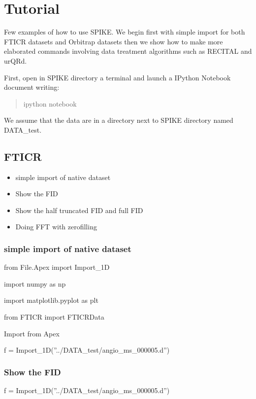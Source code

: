 \documentclass[letterpaper,10pt,openany,oneside]{sphinxmanual}
\begin{document}
\chapter{Tutorial}
\label{rst/tutorial::doc}\label{rst/tutorial:tutorial}
Few examples of how to use SPIKE.
We begin first with simple import for both FTICR datasets and Orbitrap datasets then we show how to make more elaborated commands involving data treatment algorithms such as RECITAL and urQRd.

First, open in SPIKE directory a terminal and launch a IPython Notebook document writing:
\begin{quote}

ipython notebook
\end{quote}

We assume that the data are in a directory next to SPIKE directory named DATA\_test.


\section{FTICR}
\label{rst/tutorial:fticr}\begin{itemize}
\item {} 
simple import of native dataset

\item {} 
Show the FID

\item {} 
Show the half truncated FID and full FID

\item {} 
Doing FFT with zerofilling

\end{itemize}


\subsection{simple import of native dataset}
\label{rst/tutorial:simple-import-of-native-dataset}
from File.Apex import Import\_1D

import numpy as np

import matplotlib.pyplot as plt

from FTICR import FTICRData

Import from Apex

f = Import\_1D(''../DATA\_test/angio\_ms\_000005.d'')


\subsection{Show the FID}
\label{rst/tutorial:show-the-fid}
f = Import\_1D(''../DATA\_test/angio\_ms\_000005.d'')
\end{document}
